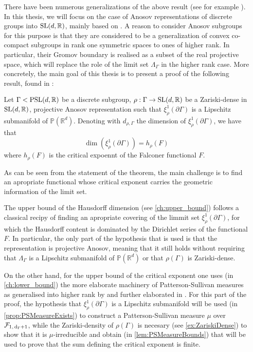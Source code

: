 \documentclass{report}
\begin{document}
There have been numerous generalizations of the above result (see for example \cite{ledrappier_dimension_2023, glorieux_hausdorff_2023, pozzetti_anosov_2023,link2004measures,quint2002mesures,coornaert1993mesures}).
In this thesis, we will focus on the case of Anosov representations of discrete groups into $\operatorname{{\mathrm{SL}}}(d, \mathbb R)$, mainly based on \cite{pozzetti_anosov_2023}.
A reason to consider Anosov subgroups for this purpose is that they are considered to be a generalization of convex co-compact subgroups in rank one symmetric spaces to ones of higher rank.
In particular, their Gromov boundary is realised as a subset of the real projective space, which will replace the role of the limit set $\Lambda_\Gamma$ in the higher rank case.
More concretely, the main goal of this thesis is to present a proof of the following result, found in \cite{pozzetti_anosov_2023}:
\begin{theorem}
    Let $\Gamma < \operatorname{{\mathrm{PSL}}}(d, \mathbb R)$ be a discrete subgroup, $\rho: \Gamma \to \operatorname{{\mathrm{SL}}}(d, \mathbb R)$ be a Zariski-dense in $\operatorname{{\mathrm{SL}}}(d, \mathbb R)$, projective Anosov representation such that $\xi^1_\rho(\partial \Gamma)$ is a Lipschitz submanifold of $\mathbb P(\mathbb R^d)$.
    Denoting with $d_{\rho, \Gamma}$ the dimension of $\xi^1_\rho(\partial \Gamma)$, we have that
    \[
        \dim(\xi^1_\rho(\partial \Gamma)) = h_\rho(F)
    \]
    where $h_\rho(F)$ is the critical expoennt of the Falconer functional $F$.
\end{theorem}
As can be seen from the statement of the theorem, the main challenge is to find an apropriate functional whose critical exponent carries the geometric information of the limit set.

The upper bound of the Hausdorff dimension (see \cref{ch:upper_bound}) follows a classical recipy of finding an apropriate covering of the limmit set $\xi_\rho^1(\partial \Gamma)$, for which the Hausdorff content is dominated by the Dirichlet series of the functional $F$.
In particular, the only part of the hypothesis that is used is that the representation is projective Anosov, meaning that it still holds without requiring that $\Lambda_\Gamma$ is a Lipschitz submanifold of $\mathbb P(\mathbb R^d)$ or that $\rho(\Gamma)$ is Zariski-dense.

On the other hand, for the upper bound of the critical exponent one uses (in \cref{ch:lower_bound}) the more elaborate machinery of Patterson-Sullivan measures as generalised into higher rank by \cite{quint2002mesures} and further elaborated in \cite{pozzetti_anosov_2023}.
For this part of the proof, the hypothesis that $\xi_\rho^1(\partial \Gamma)$ is a Lipschitz submanifold will be used (in \cref{prop:PSMeasureExists}) to construct a Patterson-Sullivan measure $\mu$ over $\mathcal F_{1, \,\mathrm{d}_\Gamma + 1}$, while the Zariski-density of $\rho(\Gamma)$ is necesary (see \cref{ex:ZariskiDense}) to show that it is $\mu$-irreducible and obtain (in \cref{lem:PSMeasureBounds}) that will be used to prove that the sum defining the critical exponent is finite. 
\end{document}
